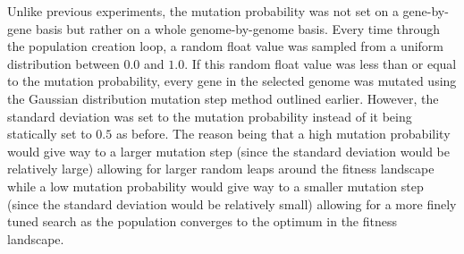 \documentclass[a4paper,10pt]{article}
\begin{document}
\vspace{3mm}

Unlike previous experiments, the mutation probability was not set on a gene-by-gene basis but rather on a whole genome-by-genome basis. Every time through the population creation loop, a random float value was sampled from a uniform distribution between $0.0$ and $1.0$. If this random float value was less than or equal to the mutation probability, every gene in the selected genome was mutated using the Gaussian distribution mutation step method outlined earlier. However, the standard deviation was set to the mutation probability instead of it being statically set to $0.5$ as before. The reason being that a high mutation probability would give way to a larger mutation step (since the standard deviation would be relatively large) allowing for larger random leaps around the fitness landscape while a low mutation probability would give way to a smaller mutation step (since the standard deviation would be relatively small) allowing for a more finely tuned search as the population converges to the optimum in the fitness landscape.
\end{document}
